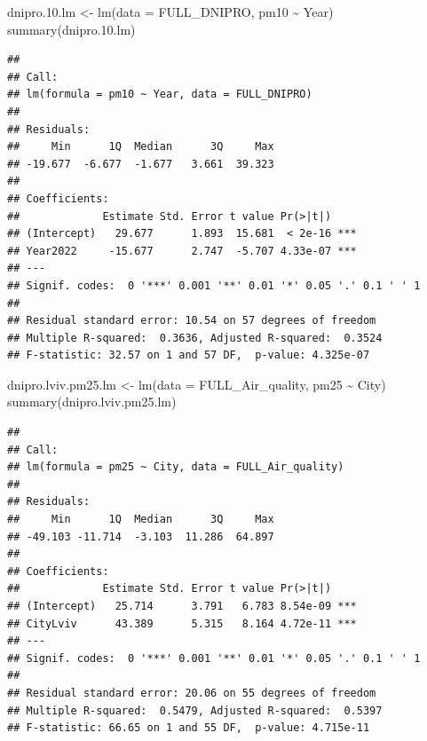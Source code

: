 \documentclass[
  12pt,
]{article}
\newenvironment{Shaded}{\begin{snugshade}}{\end{snugshade}}
\newcommand{\AttributeTok}[1]{\textcolor[rgb]{0.77,0.63,0.00}{#1}}
\newcommand{\FloatTok}[1]{\textcolor[rgb]{0.00,0.00,0.81}{#1}}
\newcommand{\FunctionTok}[1]{\textcolor[rgb]{0.00,0.00,0.00}{#1}}
\newcommand{\NormalTok}[1]{#1}
\newcommand{\OtherTok}[1]{\textcolor[rgb]{0.56,0.35,0.01}{#1}}
\newcommand{\SpecialCharTok}[1]{\textcolor[rgb]{0.00,0.00,0.00}{#1}}
\begin{document}
\begin{Shaded}
\begin{Highlighting}[]
\NormalTok{dnipro.}\FloatTok{10.}\NormalTok{lm }\OtherTok{\textless{}{-}} \FunctionTok{lm}\NormalTok{(}\AttributeTok{data =}\NormalTok{ FULL\_DNIPRO, pm10 }\SpecialCharTok{\textasciitilde{}}\NormalTok{ Year) }
\FunctionTok{summary}\NormalTok{(dnipro.}\FloatTok{10.}\NormalTok{lm) }
\end{Highlighting}
\end{Shaded}

\begin{verbatim}
## 
## Call:
## lm(formula = pm10 ~ Year, data = FULL_DNIPRO)
## 
## Residuals:
##     Min      1Q  Median      3Q     Max 
## -19.677  -6.677  -1.677   3.661  39.323 
## 
## Coefficients:
##             Estimate Std. Error t value Pr(>|t|)    
## (Intercept)   29.677      1.893  15.681  < 2e-16 ***
## Year2022     -15.677      2.747  -5.707 4.33e-07 ***
## ---
## Signif. codes:  0 '***' 0.001 '**' 0.01 '*' 0.05 '.' 0.1 ' ' 1
## 
## Residual standard error: 10.54 on 57 degrees of freedom
## Multiple R-squared:  0.3636, Adjusted R-squared:  0.3524 
## F-statistic: 32.57 on 1 and 57 DF,  p-value: 4.325e-07
\end{verbatim}

\begin{Shaded}
\begin{Highlighting}[]
\NormalTok{dnipro.lviv.pm25.lm }\OtherTok{\textless{}{-}} \FunctionTok{lm}\NormalTok{(}\AttributeTok{data =}\NormalTok{ FULL\_Air\_quality, pm25 }\SpecialCharTok{\textasciitilde{}}\NormalTok{ City) }
\FunctionTok{summary}\NormalTok{(dnipro.lviv.pm25.lm)}
\end{Highlighting}
\end{Shaded}

\begin{verbatim}
## 
## Call:
## lm(formula = pm25 ~ City, data = FULL_Air_quality)
## 
## Residuals:
##     Min      1Q  Median      3Q     Max 
## -49.103 -11.714  -3.103  11.286  64.897 
## 
## Coefficients:
##             Estimate Std. Error t value Pr(>|t|)    
## (Intercept)   25.714      3.791   6.783 8.54e-09 ***
## CityLviv      43.389      5.315   8.164 4.72e-11 ***
## ---
## Signif. codes:  0 '***' 0.001 '**' 0.01 '*' 0.05 '.' 0.1 ' ' 1
## 
## Residual standard error: 20.06 on 55 degrees of freedom
## Multiple R-squared:  0.5479, Adjusted R-squared:  0.5397 
## F-statistic: 66.65 on 1 and 55 DF,  p-value: 4.715e-11
\end{verbatim}
\end{document}
